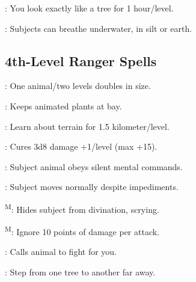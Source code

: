 : You look exactly like a tree for 1 hour/level.

: Subjects can breathe underwater, in silt or earth. %



\subsection{4th-Level Ranger Spells}

: One animal/two levels doubles in size.

: Keeps animated plants at bay.

: Learn about terrain for 1.5 kilometer/level.

: Cures 3d8 damage +1/level (max +15).

: Subject animal obeys silent mental commands.

: Subject moves normally despite impediments.

\textsuperscript{M}: Hides subject from divination, scrying.

\textsuperscript{M}: Ignore 10 points of damage per attack.

: Calls animal to fight for you.

: Step from one tree to another far away.
